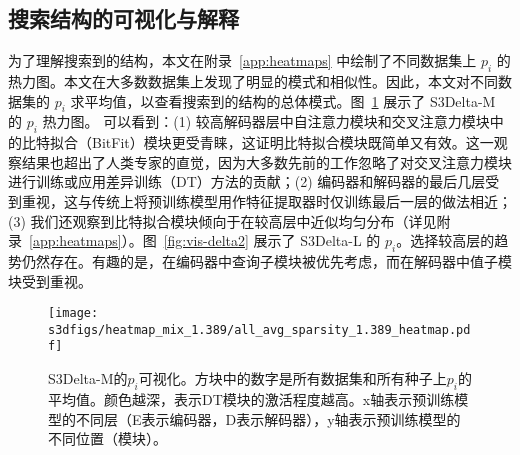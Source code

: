 \begin{table}[!htbp]
    \caption{该表列出了搜索阶段和重新训练阶段的计算资源，包括计算时间、内存消耗。}
    \label{tab:computation}
    \centering
\end{table}

\subsection{搜索结构的可视化与解释}
\label{sec:vis}
为了理解搜索到的结构，本文在附录~\ref{app:heatmaps} 中绘制了不同数据集上 $p_i$ 的热力图。本文在大多数数据集上发现了明显的模式和相似性。因此，本文对不同数据集的 $p_i$ 求平均值，以查看搜索到的结构的总体模式。图~\ref{fig:visualization} 展示了 S3Delta-M 的 $p_i$ 热力图。
可以看到：(1) 较高解码器层中自注意力模块和交叉注意力模块中的比特拟合（BitFit）模块更受青睐，这证明比特拟合模块既简单又有效。这一观察结果也超出了人类专家的直觉，因为大多数先前的工作忽略了对交叉注意力模块进行训练或应用差异训练（DT）方法的贡献；(2) 编码器和解码器的最后几层受到重视，这与传统上将预训练模型用作特征提取器时仅训练最后一层的做法相近；(3) 我们还观察到比特拟合模块倾向于在较高层中近似均匀分布（详见附录~\ref{app:heatmaps}）。图~\ref{fig:vis-delta2} 展示了 S3Delta-L 的 $p_i$。选择较高层的趋势仍然存在。有趣的是，在编码器中查询子模块被优先考虑，而在解码器中值子模块受到重视。 

\begin{figure}[!htbp]
    \centering
    \texttt{[image: s3dfigs/heatmap\_mix\_1.389/all\_avg\_sparsity\_1.389\_heatmap.pdf]}
    \caption{S3Delta-M的$p_i$可视化。方块中的数字是所有数据集和所有种子上$p_i$的平均值。颜色越深，表示DT模块的激活程度越高。x轴表示预训练模型的不同层（E表示编码器，D表示解码器），y轴表示预训练模型的不同位置（模块）。}
    \label{fig:visualization}
\end{figure}

